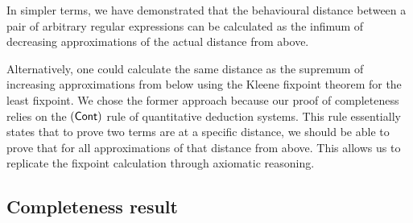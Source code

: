 In simpler terms, we have demonstrated that the behavioural distance between a pair of arbitrary regular expressions can be calculated as the infimum of decreasing approximations of the actual distance from above. 

Alternatively, one could calculate the same distance as the supremum of increasing approximations from below using the Kleene fixpoint theorem for the least fixpoint. We chose the former approach because our proof of completeness relies on the $(\textsf{Cont})$ rule of quantitative deduction systems. This rule essentially states that to prove two terms are at a specific distance, we should be able to prove that for all approximations of that distance from above. This allows us to replicate the fixpoint calculation through axiomatic reasoning.
\subsection{Completeness result}\label{c2:subsec:completeness_result}

